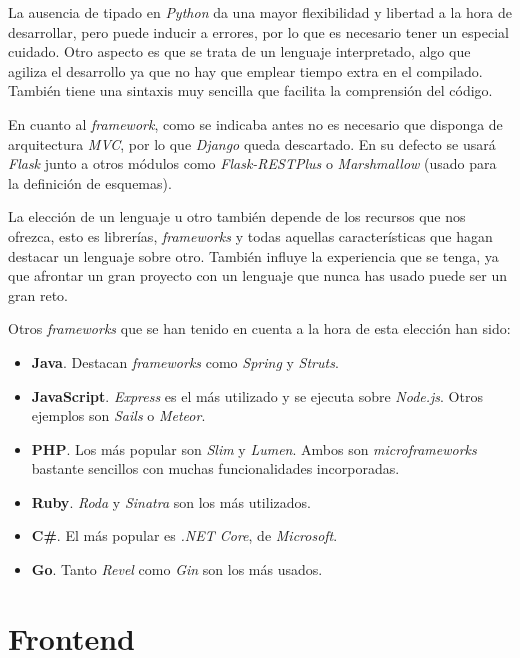 La ausencia de tipado en \textit{Python} da una mayor flexibilidad y libertad a la hora de desarrollar, pero puede inducir a errores, por lo que es necesario tener un especial cuidado. Otro aspecto es que se trata de un lenguaje interpretado, algo que agiliza el desarrollo ya que no hay que emplear tiempo extra en el compilado. También tiene una sintaxis muy sencilla que facilita la comprensión del código.

En cuanto al \textit{framework}, como se indicaba antes no es necesario que disponga de arquitectura \textit{MVC}, por lo que \textit{Django} queda descartado. En su defecto se usará \textit{Flask} junto a otros módulos como \textit{Flask-RESTPlus} o \textit{Marshmallow} (usado para la definición de esquemas).

La elección de un lenguaje u otro también depende de los recursos que nos ofrezca, esto es librerías, \textit{frameworks} y todas aquellas características que hagan destacar un lenguaje sobre otro. También influye la experiencia que se tenga, ya que afrontar un gran proyecto con un lenguaje que nunca has usado puede ser un gran reto.


\bigskip
Otros \textit{frameworks} que se han tenido en cuenta a la hora de esta elección han sido:

\begin{itemize}
	\item \textbf{Java}. Destacan \textit{frameworks} como \textit{Spring} y \textit{Struts}.	
	\item \textbf{JavaScript}. \textit{Express} es el más utilizado y se ejecuta sobre \textit{Node.js}. Otros ejemplos son \textit{Sails} o \textit{Meteor}.	
	\item \textbf{PHP}. Los más popular son \textit{Slim} y \textit{Lumen}. Ambos son \textit{microframeworks} bastante sencillos con muchas funcionalidades incorporadas.	
	\item \textbf{Ruby}. \textit{Roda} y \textit{Sinatra} son los más utilizados.	
	\item \textbf{C\#}. El más popular es \textit{.NET Core}, de \textit{Microsoft}.
	\item \textbf{Go}. Tanto \textit{Revel} como \textit{Gin} son los más usados.
\end{itemize}






\section{Frontend}

